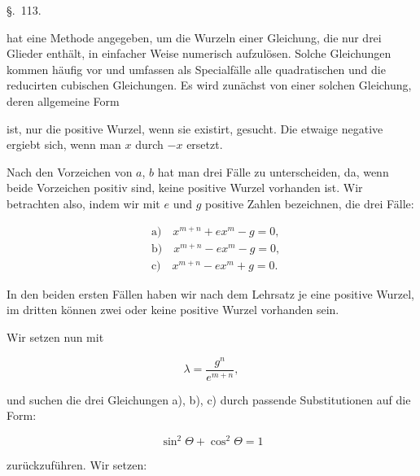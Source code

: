 
\begin{center}
\S.\ 113.


\end{center}

 hat eine Methode angegeben, um die Wurzeln einer Gleichung, die nur drei Glieder enthält, in einfacher Weise numerisch aufzulösen. Solche Gleichungen kommen häufig vor und umfassen als Specialfälle alle quadratischen und die reducirten cubischen Gleichungen. Es wird zunächst von einer solchen Gleichung, deren allgemeine Form


ist, nur die positive Wurzel, wenn sie existirt, gesucht. Die etwaige negative ergiebt sich, wenn man $x$ durch $-x$ ersetzt.

Nach den Vorzeichen von $a$, $b$ hat man drei Fälle zu unterscheiden, da, wenn beide Vorzeichen positiv sind, keine positive Wurzel vorhanden ist. Wir betrachten also, indem wir mit $e$ und $g$ positive Zahlen bezeichnen, die drei Fälle:

\[
\begin{aligned}
&\text{a)}\quad x^{m+n} + e x^m - g = 0,\\
&\text{b)}\quad x^{m+n} - e x^m - g = 0,\\
&\text{c)}\quad x^{m+n} - e x^m + g = 0.
\end{aligned}
\]

In den beiden ersten Fällen haben wir nach dem  Lehrsatz je eine positive Wurzel, im dritten können zwei oder keine positive Wurzel vorhanden sein.

Wir setzen nun mit 

\[
\lambda = \frac{g^n}{e^{m+n}},
\]

und suchen die drei Gleichungen a), b), c) durch passende Substitutionen auf die Form:

\[
\sin^2\Theta + \cos^2\Theta = 1
\]

zurückzuführen. Wir setzen:

